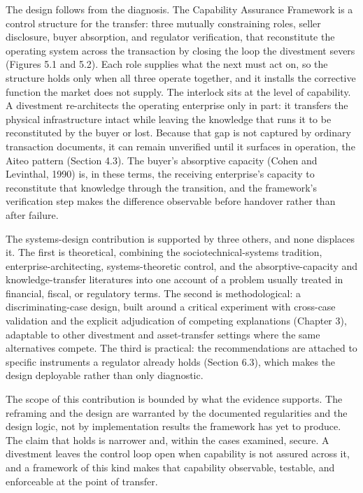 The design follows from the diagnosis. The Capability Assurance
Framework is a control structure for the transfer: three mutually
constraining roles, seller disclosure, buyer absorption, and regulator
verification, that reconstitute the operating system across the
transaction by closing the loop the divestment severs (Figures 5.1 and
5.2). Each role supplies what the next must act on, so the structure
holds only when all three operate together, and it installs the
corrective function the market does not supply. The interlock sits at
the level of capability. A divestment re-architects the operating
enterprise only in part: it transfers the physical infrastructure intact
while leaving the knowledge that runs it to be reconstituted by the
buyer or lost. Because that gap is not captured by ordinary transaction
documents, it can remain unverified until it surfaces in operation, the
Aiteo pattern (Section 4.3). The buyer's absorptive capacity (Cohen and
Levinthal, 1990) is, in these terms, the receiving enterprise's capacity
to reconstitute that knowledge through the transition, and the
framework's verification step makes the difference observable before
handover rather than after failure.

The systems-design contribution is supported by three others, and none
displaces it. The first is theoretical, combining the
sociotechnical-systems tradition, enterprise-architecting,
systems-theoretic control, and the absorptive-capacity and
knowledge-transfer literatures into one account of a problem usually
treated in financial, fiscal, or regulatory terms. The second is
methodological: a discriminating-case design, built around a critical
experiment with cross-case validation and the explicit adjudication of
competing explanations (Chapter 3), adaptable to other divestment and
asset-transfer settings where the same alternatives compete. The third
is practical: the recommendations are attached to specific instruments a
regulator already holds (Section 6.3), which makes the design deployable
rather than only diagnostic.

The scope of this contribution is bounded by what the evidence supports.
The reframing and the design are warranted by the documented
regularities and the design logic, not by implementation results the
framework has yet to produce. The claim that holds is narrower and,
within the cases examined, secure. A divestment leaves the control loop
open when capability is not assured across it, and a framework of this
kind makes that capability observable, testable, and enforceable at the
point of transfer.

